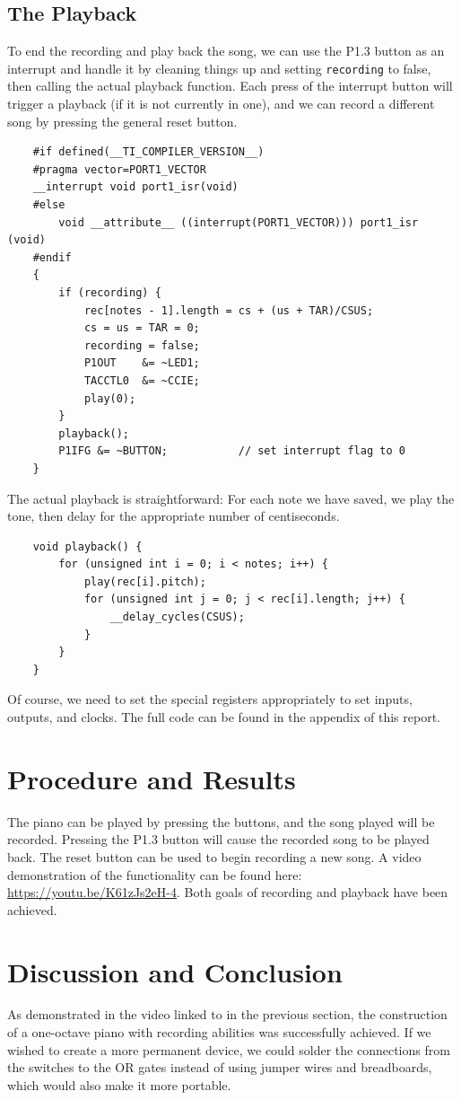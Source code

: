 \documentclass[letterpaper]{report}
\begin{document}
		\section{The Playback}
			To end the recording and play back the song, we can use the P1.3 button as an interrupt and handle it by cleaning things up and  setting \texttt{recording} to false, then calling the actual playback function. Each press of the interrupt button will trigger a playback (if it is not currently in one), and we can record a different song by pressing the general reset button.
				\begin{verbatim}
    #if defined(__TI_COMPILER_VERSION__)
    #pragma vector=PORT1_VECTOR
    __interrupt void port1_isr(void)
    #else
        void __attribute__ ((interrupt(PORT1_VECTOR))) port1_isr (void)
    #endif
    {    
        if (recording) {
            rec[notes - 1].length = cs + (us + TAR)/CSUS;
            cs = us = TAR = 0;
            recording = false;
            P1OUT    &= ~LED1;
            TACCTL0  &= ~CCIE;
            play(0);
        }
        playback();
        P1IFG &= ~BUTTON;           // set interrupt flag to 0
    }
				\end{verbatim}
			The actual playback is straightforward: For each note we have saved, we play the tone, then delay for the appropriate number of centiseconds. 
				\begin{verbatim}
    void playback() {
        for (unsigned int i = 0; i < notes; i++) {
            play(rec[i].pitch);
            for (unsigned int j = 0; j < rec[i].length; j++) {
                __delay_cycles(CSUS);
            }
        }
    }
				\end{verbatim}
		Of course, we need to set the special registers appropriately to set inputs, outputs, and clocks. The full code can be found in the appendix of this report.
	\chapter{Procedure and Results}
		The piano can be played by pressing the buttons, and the song played will be recorded. Pressing the P1.3 button will cause the recorded song to be played back. The reset button can be used to begin recording a new song. A video demonstration of the functionality can be found here: \url{https://youtu.be/K61zJs2eH-4}. Both goals of recording and playback have been achieved.
	
	\chapter{Discussion and Conclusion}
		As demonstrated in the video linked to in the previous section, the construction of a one-octave piano with recording abilities was successfully achieved. If we wished to create a more permanent device, we could solder the connections from the switches to the OR gates instead of using jumper wires and breadboards, which would also make it more portable. 
		
\end{document}
